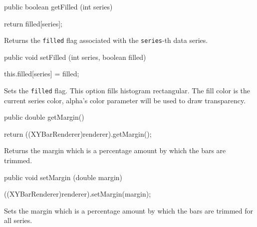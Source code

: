 \begin{code}

   public boolean getFilled (int series) \begin{hide} {
      return filled[series];
   }\end{hide}
\end{code}
\begin{tabb}
   Returns the \texttt{filled} flag associated with the \texttt{series}-th
  data series.
\end{tabb}
\begin{htmlonly}
\end{htmlonly}
\begin{code}

   public void setFilled (int series, boolean filled) \begin{hide} {
      this.filled[series] = filled;
   }\end{hide}
\end{code}
\begin{tabb}
   Sets the \texttt{filled} flag. This option fills histogram rectangular.
   The fill color is the current series color, alpha's color parameter will
   be used to draw transparency.
\end{tabb}
\begin{htmlonly}
\end{htmlonly}
\begin{code}

   public double getMargin() \begin{hide} {
      return ((XYBarRenderer)renderer).getMargin();
   }\end{hide}
\end{code}
\begin{tabb}
    Returns the margin which is a percentage amount by which the bars are trimmed.
\end{tabb}
\begin{code}

   public void setMargin (double margin) \begin{hide} {
      ((XYBarRenderer)renderer).setMargin(margin);
   }\end{hide}
\end{code}
\begin{tabb}
    Sets the margin which is a percentage amount by which the bars are trimmed for all series.
\end{tabb}
\begin{htmlonly}
\end{htmlonly}
